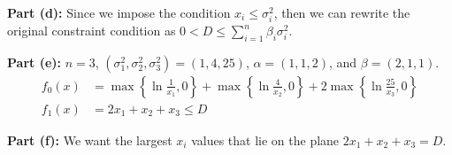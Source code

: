 \documentclass[11pt]{article}
\begin{document}
\begin{homeworkProblem}
    \textbf{Part (d):} Since we impose the condition $x_i \leq \sigma_i^2$, then we can rewrite the original constraint condition as $0 < D \leq \sum_{i=1}^n \beta_{i} \sigma_{i}^2$. \\

    \pagebreak

    \textbf{Part (e):} $n = 3$, $(\sigma_1^2, \sigma_2^2, \sigma_3^2) = (1, 4, 25)$, $\alpha = (1,1,2)$, and $\beta = (2, 1, 1).$
    \begin{align*}
        f_0(x) & = \max \left\{ \ln \frac{1}{x_1}, 0 \right\} + \max \left\{ \ln \frac{4}{x_2}, 0 \right\} + 2 \max \left\{ \ln \frac{25}{x_3}, 0 \right\} \\
        f_1(x) & = 2x_1 + x_2 + x_3 \leq D
    \end{align*}

    \textbf{Part (f):} We want the largest $x_i$ values that lie on the plane $2x_1 + x_2 + x_3 = D$.

\end{homeworkProblem}

\pagebreak
\end{document}
